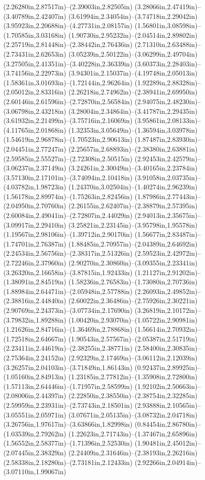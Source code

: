 (2.26280in,2.87517in)--(2.39003in,2.82505in) (3.28066in,2.47419in)--(3.40789in,2.42407in) (3.61994in,2.34054in)--(3.74718in,2.29042in) (3.95923in,2.20688in)--(4.27731in,2.08157in) (1.56801in,3.08598in)--(1.70585in,3.03168in) (1.90730in,2.95232in)--(2.04514in,2.89802in) (2.25719in,2.81448in)--(2.38442in,2.76436in) (2.71310in,2.63488in)--(2.73431in,2.62653in) (3.05239in,2.50122in)--(3.06299in,2.49704in) (3.27505in,2.41351in)--(3.40228in,2.36339in) (3.60373in,2.28403in)--(3.74156in,2.22973in) (3.94301in,2.15037in)--(4.19748in,2.05013in) (1.58361in,3.01693in)--(1.72144in,2.96264in) (1.92289in,2.88328in)--(2.05012in,2.83316in) (2.26218in,2.74962in)--(2.38941in,2.69950in) (2.60146in,2.61596in)--(2.72870in,2.56584in) (2.94075in,2.48230in)--(3.06798in,2.43218in) (3.28004in,2.34864in)--(3.41787in,2.29435in) (3.61932in,2.21499in)--(3.75716in,2.16069in) (3.95861in,2.08133in)--(4.11765in,2.01868in) (1.32353in,3.05649in)--(1.36594in,3.03978in) (1.54619in,2.96878in)--(1.70523in,2.90613in) (1.87487in,2.83930in)--(2.04451in,2.77247in) (2.25657in,2.68893in)--(2.38380in,2.63881in) (2.59585in,2.55527in)--(2.72308in,2.50515in) (2.92453in,2.42579in)--(3.06237in,2.37149in) (3.24261in,2.30049in)--(3.40165in,2.23784in) (3.57130in,2.17101in)--(3.74094in,2.10418in) (3.91058in,2.03735in)--(4.03782in,1.98723in) (1.24370in,3.02504in)--(1.40274in,2.96239in) (1.56178in,2.89974in)--(1.75263in,2.82456in) (1.87986in,2.77443in)--(2.04950in,2.70760in) (2.26155in,2.62407in)--(2.38879in,2.57395in) (2.60084in,2.49041in)--(2.72807in,2.44029in) (2.94013in,2.35675in)--(3.09917in,2.29410in) (3.25821in,2.23145in)--(3.95798in,1.95578in) (1.19567in,2.98106in)--(1.39712in,2.90170in) (1.56677in,2.83487in)--(1.74701in,2.76387in) (1.88485in,2.70957in)--(2.04389in,2.64692in) (2.24534in,2.56756in)--(2.38317in,2.51326in) (2.59523in,2.42972in)--(2.72246in,2.37960in) (2.90270in,2.30860in)--(3.09355in,2.23341in) (3.26320in,2.16658in)--(3.87815in,1.92433in) (1.21127in,2.91202in)--(1.38091in,2.84519in) (1.58236in,2.76583in)--(1.73080in,2.70736in) (1.88984in,2.64471in)--(2.05948in,2.57788in) (2.26093in,2.49852in)--(2.38816in,2.44840in) (2.60022in,2.36486in)--(2.75926in,2.30221in) (2.90769in,2.24373in)--(3.07734in,2.17690in) (3.26819in,2.10172in)--(3.79832in,1.89288in) (1.00420in,2.93070in)--(1.05722in,2.90981in) (1.21626in,2.84716in)--(1.36469in,2.78868in) (1.56614in,2.70932in)--(1.72518in,2.64667in) (1.90543in,2.57567in)--(2.05387in,2.51719in) (2.23411in,2.44619in)--(2.38255in,2.38771in) (2.58400in,2.30835in)--(2.75364in,2.24152in) (2.92329in,2.17469in)--(3.06112in,2.12039in) (3.26257in,2.04103in)--(3.71849in,1.86143in) (0.92437in,2.89925in)--(1.05160in,2.84913in) (1.23185in,2.77812in)--(1.35908in,2.72800in) (1.57113in,2.64446in)--(1.71957in,2.58599in) (1.92102in,2.50663in)--(2.08006in,2.44397in) (2.22850in,2.38550in)--(2.38754in,2.32285in) (2.59959in,2.23931in)--(2.73743in,2.18501in) (2.93888in,2.10565in)--(3.05551in,2.05971in) (3.07671in,2.05135in)--(3.08732in,2.04718in) (3.26756in,1.97617in)--(3.63866in,1.82998in) (0.84454in,2.86780in)--(1.03539in,2.79262in) (1.22623in,2.71743in)--(1.37467in,2.65896in) (1.56552in,2.58377in)--(1.71396in,2.52530in) (1.90481in,2.45012in)--(2.07445in,2.38329in) (2.24409in,2.31646in)--(2.38193in,2.26216in) (2.58338in,2.18280in)--(2.73181in,2.12433in) (2.92266in,2.04914in)--(3.07110in,1.99067in) 